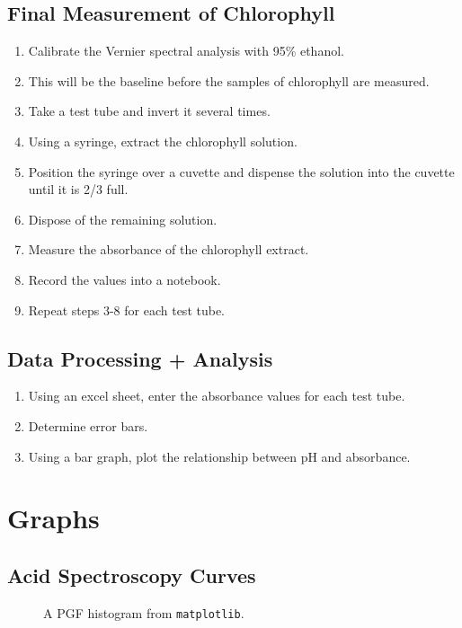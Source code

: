 \documentclass[a4paper]{article}
\begin{document}
\subsection*{Final Measurement of Chlorophyll}
\begin{enumerate}
    \item Calibrate the Vernier spectral analysis with 95\% ethanol. 
    \item This will be the baseline before the samples of chlorophyll are measured.
    \item Take a test tube and invert it several times. 
    \item Using a syringe, extract the chlorophyll solution. 
    \item Position the syringe over a cuvette and dispense the solution into the cuvette until it is 2/3 full.
    \item Dispose of the remaining solution.
    \item Measure the absorbance of the chlorophyll extract.
    \item Record the values into a notebook.
    \item Repeat steps 3-8 for each test tube. 
\end{enumerate}
\subsection*{Data Processing + Analysis}
\begin{enumerate}
    \item Using an excel sheet, enter the absorbance values for each test tube.
    \item Determine error bars.
    \item Using a bar graph, plot the relationship between pH and absorbance.
\end{enumerate}
\newpage
\section*{Graphs}
\subsection*{Acid Spectroscopy Curves}
\begin{figure}[h]
    \begin{center}
        
    \end{center}
    \caption{A PGF histogram from \texttt{matplotlib}.}
\end{figure}
\newpage
\end{document}
